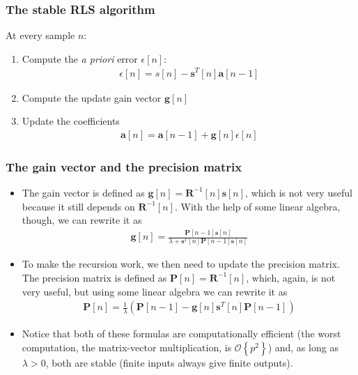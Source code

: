 \documentclass{beamer}
\begin{document}
\begin{frame}
  \frametitle{The stable RLS algorithm}

  At every sample $n$:
  \begin{enumerate}
  \item Compute the \textit{a priori} error $\epsilon[n]$:
    \begin{align*}
      \epsilon[n] = s[n] - \mathbf{s}^T[n]\mathbf{a}[n-1]
    \end{align*}
  \item Compute the update gain vector $\mathbf{g}[n]$
  \item Update the coefficients
    \begin{align*}
      \mathbf{a}[n] = \mathbf{a}[n-1]+\mathbf{g}[n]\epsilon[n]
    \end{align*}
  \end{enumerate}
\end{frame}

\begin{frame}
  \frametitle{The gain vector and the precision matrix}

  \begin{itemize}
  \item The gain vector is defined as
    $\mathbf{g}[n]=\mathbf{R}^{-1}[n]\mathbf{s}[n]$, which is not very
    useful because it still depends on $\mathbf{R}^{-1}[n]$.  With the
    help of some linear algebra, though, we can rewrite it as
    \begin{align*}
      \mathbf{g}[n] =
      \frac{\mathbf{P}[n-1]\mathbf{s}[n]}{\lambda+\mathbf{s}^T[n]\mathbf{P}[n-1]\mathbf{s}[n]}
    \end{align*}
  \item To make the recursion work, we then need to update the
    precision matrix.  The precision matrix is defined as
    $\mathbf{P}[n]=\mathbf{R}^{-1}[n]$, which, again, is not very
    useful, but using some linear algebra we can rewrite it as
    \begin{align*}
      \mathbf{P}[n]=\frac{1}{\lambda}\left(\mathbf{P}[n-1]
      -\mathbf{g}[n]\mathbf{s}^T[n]\mathbf{P}[n-1]\right)
    \end{align*}
    \item Notice that both of these formulas are computationally
      efficient (the worst computation, the matrix-vector
      multiplication, is $\mathcal{O}\left\{p^2\right\}$) and, as long
      as $\lambda>0$, both are stable (finite inputs always give
      finite outputs).
  \end{itemize}
\end{frame}
\end{document}
